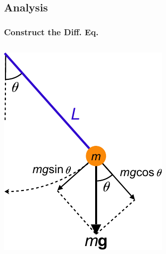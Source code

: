\documentclass[pdf,hideothersubsections]{beamer}
\begin{document}
\subsection{Analysis}
\begin{frame}
\frametitle{Construct the Diff. Eq.}
\begin{columns}[T]

  \begin{column}{0.3\textwidth}
     \includegraphics[width=\textwidth]{Simple_pendulum_generalized_coordinates.pdf}


\end{column}
\end{columns}
\end{frame}
\end{document}
